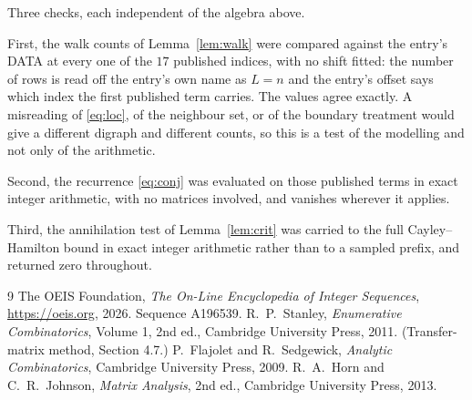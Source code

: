 \documentclass[11pt,a4paper]{article}
\theoremstyle{plain}
\theoremstyle{definition}
\begin{document}
Three checks, each independent of the algebra above.

First, the walk counts of Lemma~\ref{lem:walk} were compared against the entry's DATA at
every one of the $17$ published indices, with no shift fitted: the number of rows is
read off the entry's own name as $L=n$ and the entry's offset says which index the first
published term carries. The values agree exactly. A misreading of \eqref{eq:loc}, of the
neighbour set, or of the boundary treatment would give a different digraph and different
counts, so this is a test of the modelling and not only of the arithmetic.

Second, the recurrence \eqref{eq:conj} was evaluated on those published terms in exact
integer arithmetic, with no matrices involved, and vanishes wherever it applies.

Third, the annihilation test of Lemma~\ref{lem:crit} was carried to the full
Cayley--Hamilton bound in exact integer arithmetic rather than to a sampled prefix, and
returned zero throughout.

\begin{thebibliography}{9}
 The OEIS Foundation, \emph{The On-Line Encyclopedia of Integer
Sequences}, \url{https://oeis.org}, 2026. Sequence A196539.
 R.~P.~Stanley, \emph{Enumerative Combinatorics}, Volume 1, 2nd ed.,
Cambridge University Press, 2011. (Transfer-matrix method, Section 4.7.)
 P.~Flajolet and R.~Sedgewick, \emph{Analytic Combinatorics}, Cambridge
University Press, 2009.
 R.~A.~Horn and C.~R.~Johnson, \emph{Matrix Analysis}, 2nd ed., Cambridge
University Press, 2013.
\end{thebibliography}
\end{document}
